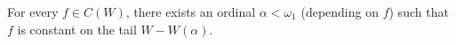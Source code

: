 For every $f \in C(W)$, there exists an ordinal $\alpha < \omega_1$ (depending on $f$) such that $f$ is constant on the tail $W - W(\alpha)$.
